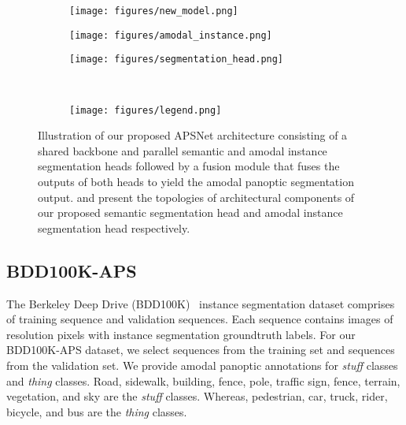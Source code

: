 \documentclass[10pt,twocolumn,letterpaper]{article}
\begin{document}
\begin{figure*}
    \centering
    \begin{subfigure}[b]{0.30\linewidth}
        \centering
        \texttt{[image: figures/new\_model.png]}
        \label{APSNEt_arch}
    \end{subfigure}
        \hfill
    \begin{subfigure}[b]{0.4\linewidth}
        \centering
        \texttt{[image: figures/amodal\_instance.png]}
        \label{amodal_segmentation_head1}
    \end{subfigure}
    \hfill
    \begin{subfigure}[b]{0.25\linewidth}
        \centering
        \texttt{[image: figures/segmentation\_head.png]}
        \label{semantic_segmentation_head}
    \end{subfigure}
    \\
    \vspace{0.2cm}
    \begin{subfigure}[b]{0.7\linewidth}
        \centering
        \texttt{[image: figures/legend.png]}
        \label{panoptic_segmentation_eg1}
    \end{subfigure}
\vspace{-0.5cm}
\caption{ Illustration of our proposed \mbox{APSNet} architecture consisting of a shared backbone and parallel semantic and amodal instance segmentation heads followed by a fusion module that fuses the outputs of both heads to yield the amodal panoptic segmentation output.  and  present the topologies of architectural components of our proposed semantic segmentation head and amodal instance segmentation head respectively.}
    \label{fig:network}
    \vspace{-0.3cm}
\end{figure*}

\subsection{BDD100K-APS}

The Berkeley Deep Drive (BDD100K)~\cite{yu2018bdd100k} instance segmentation dataset comprises of  training sequence and  validation sequences. Each sequence contains  images of resolution  pixels with instance segmentation groundtruth labels. For our BDD100K-APS dataset, we select  sequences from the training set and  sequences from the validation set. We provide amodal panoptic annotations for  \textit{stuff} classes and  \textit{thing} classes. Road, sidewalk, building, fence, pole, traffic sign, fence, terrain, vegetation, and sky are the \textit{stuff} classes. Whereas, pedestrian, car, truck, rider, bicycle, and bus are the \textit{thing} classes. 
\end{document}
